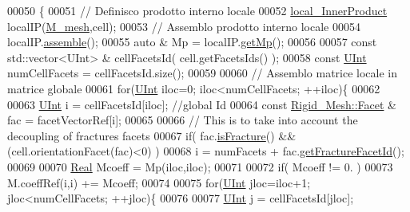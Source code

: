 \begin{DoxyCode}
00050         \{               
00051                 \textcolor{comment}{// Definisco prodotto interno locale}
00052                 \hyperlink{classFVCode3D_1_1local__InnerProduct}{local\_InnerProduct}   localIP(\hyperlink{classFVCode3D_1_1global__Operator_a027911d0f801f6f19a3006329ec30a7f}{M\_mesh},cell);
00053                 \textcolor{comment}{// Assemblo prodotto interno locale}
00054                 localIP.\hyperlink{classFVCode3D_1_1local__InnerProduct_a5e5ade44aeb3e5982cdbc20e7721e07a}{assemble}();
00055                 \textcolor{keyword}{auto} & Mp = localIP.\hyperlink{classFVCode3D_1_1local__InnerProduct_a16d585bf2b6ed9f84bab4eff1027b671}{getMp}();
00056                 
00057                 \textcolor{keyword}{const} std::vector<UInt> & cellFacetsId( cell.getFacetsIds() );
00058                 \textcolor{keyword}{const} \hyperlink{namespaceFVCode3D_a4bf7e328c75d0fd504050d040ebe9eda}{UInt} numCellFacets  = cellFacetsId.size();
00059                 
00060                 \textcolor{comment}{// Assemblo matrice locale in matrice globale}
00061                 \textcolor{keywordflow}{for}(\hyperlink{namespaceFVCode3D_a4bf7e328c75d0fd504050d040ebe9eda}{UInt} iloc=0; iloc<numCellFacets; ++iloc)\{
00062                         
00063             \hyperlink{namespaceFVCode3D_a4bf7e328c75d0fd504050d040ebe9eda}{UInt} i = cellFacetsId[iloc];                                 \textcolor{comment}{//global Id}
00064             \textcolor{keyword}{const} \hyperlink{classFVCode3D_1_1Rigid__Mesh_1_1Facet}{Rigid\_Mesh::Facet} & fac = facetVectorRef[i];     
00065             
00066             \textcolor{comment}{// This is to take into account the decoupling of fractures facets}
00067                         \textcolor{keywordflow}{if}( fac.\hyperlink{classFVCode3D_1_1Rigid__Mesh_1_1Facet_aed3f579d52847e839501f647e90c35ab}{isFracture}() && (cell.orientationFacet(fac)<0) )
00068                                         i = numFacets + fac.\hyperlink{classFVCode3D_1_1Rigid__Mesh_1_1Facet_a08dc369eccd02b29133187cede7511eb}{getFractureFacetId}();
00069 
00070             \hyperlink{namespaceFVCode3D_a40c1f5588a248569d80aa5f867080e83}{Real} Mcoeff = Mp(iloc,iloc);
00071 
00072             \textcolor{keywordflow}{if}( Mcoeff != 0. )
00073                 M.coeffRef(i,i) += Mcoeff;
00074 
00075             \textcolor{keywordflow}{for}(\hyperlink{namespaceFVCode3D_a4bf7e328c75d0fd504050d040ebe9eda}{UInt} jloc=iloc+1; jloc<numCellFacets; ++jloc)\{
00076 
00077                 \hyperlink{namespaceFVCode3D_a4bf7e328c75d0fd504050d040ebe9eda}{UInt} j = cellFacetsId[jloc];

\end{DoxyCode}

